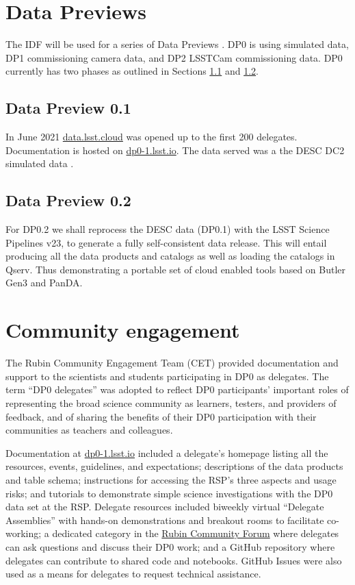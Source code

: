 \section {Data Previews}
The IDF will be used for a series of Data Previews \citep[DP;][]{RDO-011}. DP0 is using simulated data, DP1 commissioning camera data,
and DP2 LSSTCam commissioning data. DP0 currently has two phases as outlined in Sections \ref{sec:dp01} and \ref{sec:dp02}\citep{RTN-001}.

\subsection{Data Preview 0.1}\label{sec:dp01}
In June 2021 \href{https://data.lsst.cloud}{data.lsst.cloud} was opened up to the first 200 delegates.
Documentation is hosted on \href{https://dp0-1.lsst.io}{dp0-1.lsst.io}.
The data served was a the DESC DC2 simulated data \citep{arXiv:2010.05926}.



\subsection{Data Preview 0.2}\label{sec:dp02}
For DP0.2 we shall reprocess the DESC data (DP0.1) with the LSST Science Pipelines v23, to generate a fully self-consistent data release.
This will entail producing all the data products and catalogs as well as loading the  catalogs in Qserv.
Thus demonstrating a portable set of cloud enabled tools based on Butler Gen3 \citep{2019ASPC..523..653J} and PanDA.


\section{Community engagement }
The Rubin Community Engagement Team (CET) provided documentation and support to the scientists and students participating in DP0 as delegates.
The term ``DP0 delegates'' was adopted to reflect DP0 participants’ important roles of representing the broad science community as learners, testers, and providers of feedback, and of sharing the benefits of their DP0 participation with their communities as teachers and colleagues.

Documentation at \href{https://dp0-1.lsst.io}{dp0-1.lsst.io} included a delegate's homepage listing all the resources, events, guidelines, and expectations; descriptions of the data products and table schema; instructions for accessing the RSP's three aspects and usage risks; and tutorials to demonstrate simple science investigations with the DP0 data set at the RSP.
Delegate resources included biweekly virtual ``Delegate Assemblies'' with hands-on demonstrations and breakout rooms to facilitate co-working; a dedicated category in the \href{https://community.lsst.org}{Rubin Community Forum} where delegates can ask questions and discuss their DP0 work; and a GitHub repository where delegates can contribute to shared code and notebooks.
GitHub Issues were also used as a means for delegates to request technical assistance.

